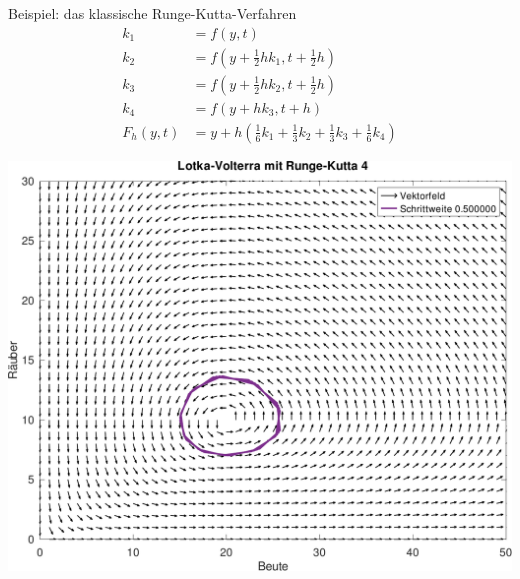 \begin{frame}
\begin{center}
  \end{center}
\end{frame}

\begin{frame}{Beispiel: das \glqq{}klassische\grqq{} Runge-Kutta-Verfahren}
  \begin{align*}
    k_1 &= f\left(y,t\right)\\
    k_2 &= f\left(y+\tfrac12 hk_1, t+\tfrac12 h\right)\\
    k_3 &= f\left(y+\tfrac12 hk_2, t+\tfrac12 h\right)\\
    k_4 &= f\left(y+ hk_3, t+h\right)\\
    F_h(y,t) &= y+h\left(\tfrac16k_1+\tfrac13k_2+\tfrac13k_3+\tfrac16k_4\right)
  \end{align*}
\end{frame}

\begin{frame}
  \begin{center}
    \includegraphics[width=.8\textwidth]{fig/RK4-LV-40-crop.pdf}
  \end{center}
\end{frame}

